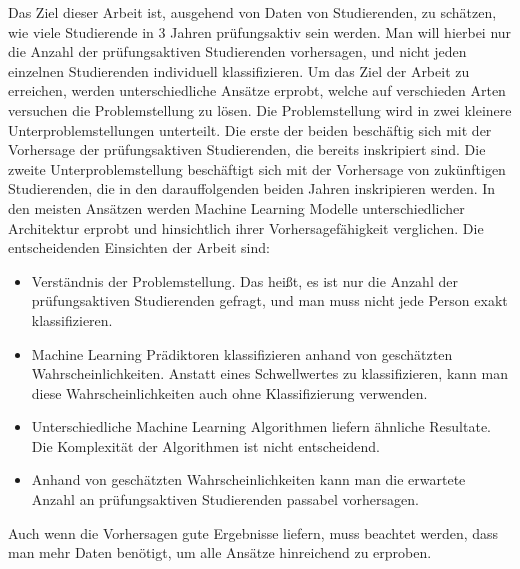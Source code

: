 
Das Ziel dieser Arbeit ist, ausgehend von Daten von Studierenden, zu sch\"atzen, wie viele
Studierende in 3 Jahren pr\"ufungsaktiv sein werden. Man will hierbei nur die Anzahl der pr\"ufungsaktiven Studierenden vorhersagen,
und nicht jeden einzelnen Studierenden individuell klassifizieren.
Um das Ziel der Arbeit zu erreichen, werden unterschiedliche Ans\"atze erprobt, welche auf verschieden Arten versuchen die Problemstellung zu l\"osen.
Die Problemstellung wird in zwei kleinere Unterproblemstellungen unterteilt. Die erste der beiden besch\"aftig sich mit der Vorhersage der pr\"ufungsaktiven Studierenden,
die bereits inskripiert sind. Die zweite Unterproblemstellung besch\"aftigt sich mit der Vorhersage von zuk\"unftigen Studierenden, die in den darauffolgenden beiden Jahren inskripieren werden.
In den meisten Ans\"atzen werden Machine Learning Modelle unterschiedlicher Architektur erprobt und hinsichtlich ihrer Vorhersagef\"ahigkeit
verglichen.
Die entscheidenden Einsichten der Arbeit sind:
\begin{itemize}
    \item Verst\"andnis der Problemstellung. Das hei{\ss}t, es ist nur die Anzahl der pr\"ufungsaktiven Studierenden gefragt, und man muss nicht jede Person exakt klassifizieren.
    \item Machine Learning Pr\"adiktoren klassifizieren anhand von gesch\"atzten Wahrscheinlichkeiten. Anstatt eines Schwellwertes zu klassifizieren,
          kann man diese Wahrscheinlichkeiten auch ohne Klassifizierung verwenden.
    \item Unterschiedliche Machine Learning Algorithmen liefern \"ahnliche Resultate. Die Komplexit\"at der Algorithmen ist nicht entscheidend.
    \item Anhand von gesch\"atzten Wahrscheinlichkeiten kann man die erwartete Anzahl an pr\"ufungsaktiven Studierenden passabel vorhersagen.
\end{itemize}

Auch wenn die Vorhersagen gute Ergebnisse liefern, muss beachtet werden, dass man mehr Daten ben\"otigt, um alle Ans\"atze hinreichend zu erproben.

